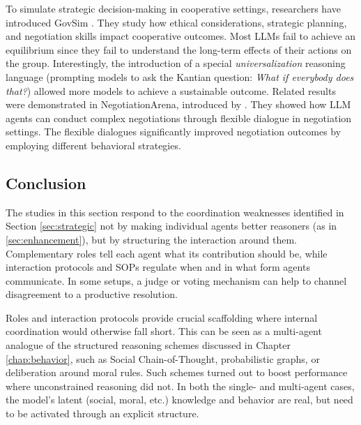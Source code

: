 To simulate strategic decision-making in cooperative settings, researchers have introduced GovSim \citep{piatti2024cooperate}. They study how ethical considerations, strategic planning, and negotiation skills impact cooperative outcomes. Most LLMs fail to achieve an equilibrium since they fail to understand the long-term effects of their actions on the group. Interestingly, the introduction of a special \emph{universalization} reasoning language \citep{levine2020logic} (prompting models to ask the Kantian question: \emph{What if everybody does that?}) allowed more models to achieve a sustainable outcome. Related results were demonstrated in NegotiationArena, introduced by \citet{bianchi2024well}. They showed how LLM agents can conduct complex negotiations through flexible dialogue in negotiation settings. The flexible dialogues significantly improved negotiation outcomes by employing different behavioral strategies. 

\subsection{Conclusion}
The studies in this section respond to the coordination weaknesses identified in Section \ref{sec:strategic} not by making individual agents better reasoners (as in \ref{sec:enhancement}), but by structuring the interaction around them. Complementary roles tell each agent what its contribution should be, while interaction protocols and SOPs regulate when and in what form agents communicate. In some setups, a judge or voting mechanism can help to channel disagreement to a productive resolution.

Roles and interaction protocols provide crucial scaffolding where internal coordination would otherwise fall short. This can be seen as a multi-agent analogue of the structured reasoning schemes discussed in Chapter \ref{chap:behavior}, such as Social Chain-of-Thought, probabilistic graphs, or deliberation around moral rules. Such schemes turned out to boost performance where unconstrained reasoning did not. In both the single- and multi-agent cases, the model's latent (social, moral, etc.) knowledge and behavior are real, but need to be activated through an explicit structure.


